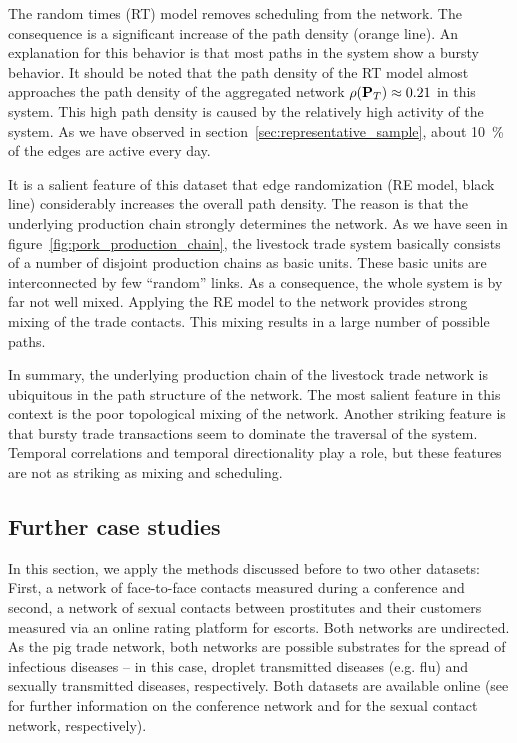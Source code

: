 The random times (RT) model removes scheduling from the network.
The consequence is a significant increase of the path density (orange line).
An explanation for this behavior is that most paths in the system show a bursty behavior.
It should be noted that the path density of the RT model almost approaches the path density of the aggregated network $\rho (\mathbf{P}_T)\approx 0.21$ in this system.
This high path density is caused by the relatively high activity of the system.
As we have observed in section~\ref{sec:representative_sample}, about 10~\% of the edges are active every day.

It is a salient feature of this dataset that edge randomization (RE model, black line) considerably increases the overall path density.
The reason is that the underlying production chain strongly determines the network.
As we have seen in figure~\ref{fig:pork_production_chain}, the livestock trade system basically consists of a number of disjoint production chains as basic units.
These basic units are interconnected by few ``random'' links.
As a consequence, the whole system is by far not well mixed.
Applying the RE model to the network provides strong mixing of the trade contacts.
This mixing results in a large number of possible paths.

In summary, the underlying production chain of the livestock trade network is ubiquitous in the path structure of the network.
The most salient feature in this context is the poor topological mixing of the network.
Another striking feature is that bursty trade transactions seem to dominate the traversal of the system.
Temporal correlations and temporal directionality play a role, but these features are not as striking as mixing and scheduling.

\subsection{Further case studies}
In this section, we apply the methods discussed before to two other datasets:
First, a network of face-to-face contacts measured during a conference and second, a network of sexual contacts between prostitutes and their customers measured via an online rating platform for escorts.
Both networks are undirected.
As the pig trade network, both networks are possible substrates for the spread of infectious diseases -- in this case, droplet transmitted diseases (e.g. flu) and sexually transmitted diseases, respectively.
Both datasets are available online (see \citep{isella2011,sociopatterns.org} for further information on the conference network and \citep{Rocha_pnas} for the sexual contact network, respectively).

